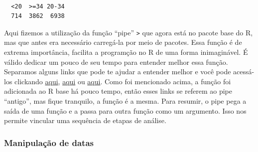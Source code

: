 \documentclass[
  letterpaper,
  DIV=11,
  numbers=noendperiod]{scrreprt}
\newenvironment{Shaded}{\begin{snugshade}}{\end{snugshade}}
\newcommand{\AttributeTok}[1]{\textcolor[rgb]{0.40,0.45,0.13}{#1}}
\newcommand{\CommentTok}[1]{\textcolor[rgb]{0.37,0.37,0.37}{#1}}
\newcommand{\DecValTok}[1]{\textcolor[rgb]{0.68,0.00,0.00}{#1}}
\newcommand{\FunctionTok}[1]{\textcolor[rgb]{0.28,0.35,0.67}{#1}}
\newcommand{\NormalTok}[1]{\textcolor[rgb]{0.00,0.23,0.31}{#1}}
\newcommand{\OtherTok}[1]{\textcolor[rgb]{0.00,0.23,0.31}{#1}}
\newcommand{\SpecialCharTok}[1]{\textcolor[rgb]{0.37,0.37,0.37}{#1}}
\newcommand{\StringTok}[1]{\textcolor[rgb]{0.13,0.47,0.30}{#1}}
\begin{document}
\begin{Shaded}
\end{Shaded}

\begin{verbatim}

  <20  >=34 20-34 
  714  3862  6938 
\end{verbatim}

Aqui fizemos a utilização da função ``pipe''
\texttt{\textbar{}\textgreater{}} que agora está no pacote base do R,
mas que antes era necessário carregá-la por meio de pacotes. Essa função
é de extrema importância, facilita a programção no R de uma forma
inimaginável. É válido dedicar um pouco de seu tempo para entender
melhor essa função. Separamos alguns links que pode te ajudar a entender
melhor e você pode acessá-los clickando
\href{https://uc-r.github.io/pipe}{aqui},
\href{https://towardsdatascience.com/an-introduction-to-the-pipe-in-r-823090760d64\#:~:text=What\%20does\%20the\%20pipe\%20do,a\%20sequence\%20of\%20analysis\%20steps.}{aqui}
ou \href{https://www.datacamp.com/tutorial/pipe-r-tutorial}{aqui}. Como
foi mencionado acima, a função foi adicionada ao R base há pouco tempo,
então esses links se referem ao pipe ``antigo'', mas fique tranquilo, a
função é a mesma. Para resumir, o pipe pega a saída de uma função e a
passa para outra função como um argumento. Isso nos permite vincular uma
sequência de etapas de análise.

\hypertarget{manipulauxe7uxe3o-de-datas}{%
\subsubsection{Manipulação de datas}\label{manipulauxe7uxe3o-de-datas}}
\end{document}
